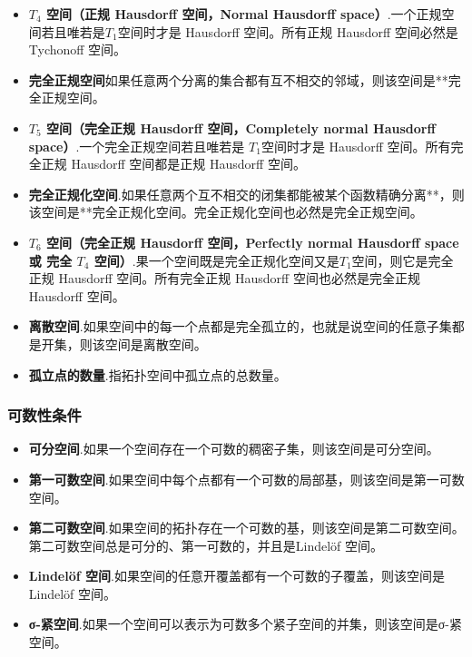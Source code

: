\begin{itemize}
\item \textbf{$T_4$ 空间（正规 Hausdorff 空间，Normal Hausdorff space）}.一个正规空间若且唯若是$T_1$空间时才是 Hausdorff 空间。所有正规 Hausdorff 空间必然是 Tychonoff 空间。
\item \textbf{完全正规空间}如果任意两个分离的集合都有互不相交的邻域，则该空间是**完全正规空间。
\item \textbf{$T_5$ 空间（完全正规 Hausdorff 空间，Completely normal Hausdorff space）}.一个完全正规空间若且唯若是 $T_1$空间时才是 Hausdorff 空间。所有完全正规 Hausdorff 空间都是正规 Hausdorff 空间。
\item \textbf{完全正规化空间}.如果任意两个互不相交的闭集都能被某个函数精确分离**，则该空间是**完全正规化空间。完全正规化空间也必然是完全正规空间。
\item \textbf{$T_6$ 空间（完全正规 Hausdorff 空间，Perfectly normal Hausdorff space 或 完全 $T_4$ 空间）}.果一个空间既是完全正规化空间又是$T_1$空间，则它是完全正规 Hausdorff 空间。所有完全正规 Hausdorff 空间也必然是完全正规 Hausdorff 空间。
\item \textbf{离散空间}.如果空间中的每一个点都是完全孤立的，也就是说空间的任意子集都是开集，则该空间是离散空间。
\item \textbf{孤立点的数量}.指拓扑空间中孤立点的总数量。
\end{itemize}
\subsubsection{可数性条件}
\begin{itemize}
\item \textbf{可分空间}.如果一个空间存在一个可数的稠密子集，则该空间是可分空间。
\item \textbf{第一可数空间}.如果空间中每个点都有一个可数的局部基，则该空间是第一可数空间。
\item \textbf{第二可数空间}.如果空间的拓扑存在一个可数的基，则该空间是第二可数空间。第二可数空间总是可分的、第一可数的，并且是Lindelöf 空间。
\item \textbf{Lindelöf 空间}.如果空间的任意开覆盖都有一个可数的子覆盖，则该空间是Lindelöf 空间。
\item \textbf{σ-紧空间}.如果一个空间可以表示为可数多个紧子空间的并集，则该空间是σ-紧空间。
\end{itemize}
